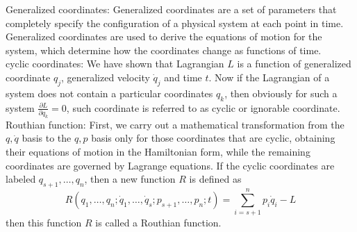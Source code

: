\documentclass[12pt]{article}
\begin{document}
\begin{soln}
    Generalized coordinates: Generalized coordinates are a set of parameters that completely specify the configuration of a physical system at each point in time. Generalized coordinates are used to derive the equations of motion for the system, which determine how the coordinates change as functions of time.\\

    cyclic coordinates: We have shown that Lagrangian \(L\) is a function of generalized coordinate \(q_j\), generalized velocity \(\dot{q}_j\) and time \(t\). Now if the Lagrangian of a system does not contain a particular coordinates \(q_k\), then obviously for such a system \(\frac{\partial L}{\partial q_k}=0\), such coordinate is referred to as cyclic or ignorable coordinate.\\

    Routhian function: First, we carry out a mathematical transformation from the \(q,\dot{q}\) basis to the \(q,p\) basis only for those coordinates that are cyclic, obtaining their equations of motion in the Hamiltonian form, while the remaining coordinates are governed by Lagrange equations. If the cyclic coordinates are labeled \(q_{s+1},\dots,q_n\), then a new function \(R\) is defined as
    \[R(q_1,\dots,q_n;\dot{q}_1,\dots,\dot{q}_s;p_{s+1},\dots,p_n;t)=\sum_{i=s+1}^n p_i\dot{q}_i-L\]
    then this function \(R\) is called a Routhian function.
\end{soln}
\end{document}
